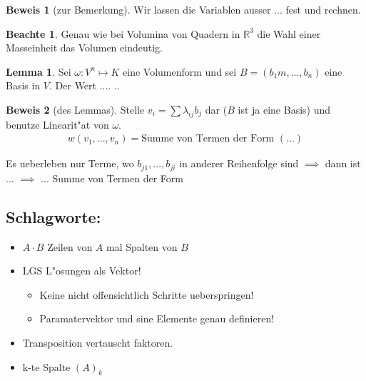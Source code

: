 \documentclass[11pt]{article}
\theoremstyle{remark}
\theoremstyle{definition}
\newtheorem{prof}{Beweis}
\newtheorem*{notte}{Beachte}
\newtheorem*{lemma}{Lemma}
\theoremstyle{remark}
\begin{document}
\begin{prof}[zur Bemerkung]
  Wir lassen die Variablen ausser ... fest und rechnen.
\end{prof}

\begin{notte}
  Genau wie bei Volumina von Quadern in $\mathbb{R}^3$ die Wahl einer
  Masseinheit das Volumen eindeutig.
\end{notte}

\begin{lemma}
  Sei $\omega: V^n\mapsto K$ eine Volumenform und sei $B=(b_1m, ... , b_n)$
  eine Basis in $V$. Der Wert ....  ..
\end{lemma}

\begin{prof}[des Lemmas]
  Stelle $v_i=\sum{\lambda_{ij}b_j}$ dar ($B$ ist ja eine Basis) und benutze
  Linearit"at von $\omega$.
  \begin{align*}
    w(v_1, ..., v_n)=\text{Summe von Termen der Form } (...)
  \end{align*}

  Es ueberleben nur Terme, wo $b_{j1},...,b_{ji}$ in anderer Reihenfolge sind
  $\implies$ dann ist ... $\implies$ ... Summe von Termen der Form
\end{prof}

\subsection{Schlagworte:}
\label{sec:orgcf8c685}
\begin{itemize}
\item \(A\cdot B\) Zeilen von \(A\) mal Spalten von \(B\)
\item LGS L"osungen als Vektor!
\begin{itemize}
\item Keine nicht offensichtlich Schritte ueberspringen!
\item Paramatervektor und sine Elemente genau definieren!
\end{itemize}
\item Transposition vertauscht faktoren.
\item k-te Spalte \((A)_k\)
\end{itemize}
\end{document}
